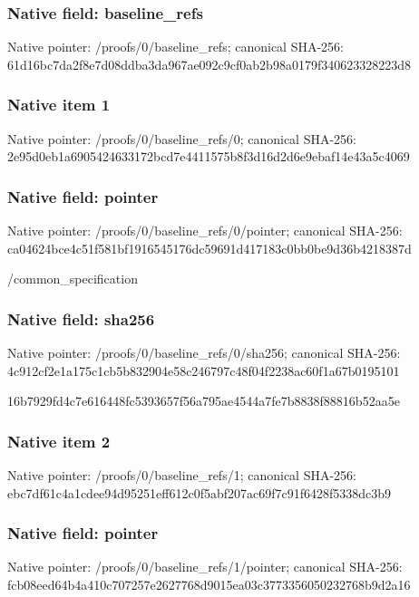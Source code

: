 \documentclass[10pt,a4paper]{article}
\begin{document}
\subsubsection{Native field: baseline\_\allowbreak{}refs}
Native pointer: /proofs/0/baseline\_\allowbreak{}refs; canonical SHA-256: 61d16bc7da2f8e7d08ddba3da967ae092c9cf0ab2b98a0179f340623328223d8

\subsubsection{Native item 1}
Native pointer: /proofs/0/baseline\_\allowbreak{}refs/0; canonical SHA-256: 2e95d0eb1a6905424633172bcd7e4411575b8f3d16d2d6e9ebaf14e43a5c4069

\subsubsection{Native field: pointer}
Native pointer: /proofs/0/baseline\_\allowbreak{}refs/0/pointer; canonical SHA-256: ca04624bce4c51f581bf1916545176dc59691d417183c0bb0be9d36b4218387d

\begingroup\raggedright\sloppy /\allowbreak{}common\_\allowbreak{}specification\par\endgroup

\subsubsection{Native field: sha256}
Native pointer: /proofs/0/baseline\_\allowbreak{}refs/0/sha256; canonical SHA-256: 4c912cf2e1a175c1cb5b832904e58c246797c48f04f2238ac60f1a67b0195101

\begingroup\raggedright\sloppy 16b7929fd4c7e616448fc5393657f56a795ae4544a7fe7b8838f88816b52aa5e\par\endgroup

\subsubsection{Native item 2}
Native pointer: /proofs/0/baseline\_\allowbreak{}refs/1; canonical SHA-256: ebc7df61c4a1cdee94d95251eff612c0f5abf207ac69f7c91f6428f5338dc3b9

\subsubsection{Native field: pointer}
Native pointer: /proofs/0/baseline\_\allowbreak{}refs/1/pointer; canonical SHA-256: fcb08eed64b4a410c707257e2627768d9015ea03c3773356050232768b9d2a16
\end{document}
